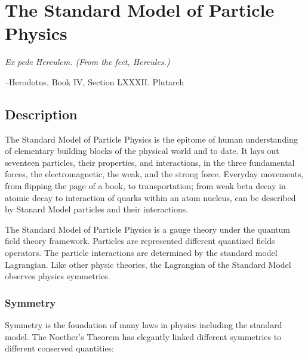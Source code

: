 \chapter{The Standard Model of Particle Physics}
\label{chapter:SM}

	
\epigraph{\textit{Ex pede Herculem. \newline(From the feet, Hercules.)}}{--Herodotus, Book IV, Section LXXXII. Plutarch}




\section{Description}
The Standard Model of Particle Physics is the epitome of human understanding of elementary building blocks of the physical world and to date. It lays out seventeen particles, their properties, and interactions, in the three fundamental forces, the electromagnetic, the weak, and the strong force. Everyday movements, from flipping the page of a book, to transportation; from weak beta decay in atomic decay to interaction of quarks within an atom nucleus, can be described by Stanard Model
particles and their interactions.

The Standard Model of Particle Physics is a gauge theory under the quantum field theory framework. Particles are represented different quantized fields operators. The particle interactions are determined by the standard model Lagrangian. Like other physic theories, the Lagrangian of the Standard Model observes physics symmetries.

\subsection*{Symmetry}
    Symmetry is the foundation of many laws in physics including the standard model. The Noether's Theorem has elegantly linked different symmetries to different conserved quantities:



